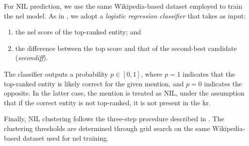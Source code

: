 For NIL prediction, we use the same Wikipedia-based dataset employed to train the \ac{nel} model.  
As in , we adopt a \textit{logistic regression classifier} that takes as input:
\begin{enumerate}
    \item the \ac{nel} score of the top-ranked entity; and
    \item the difference between the top score and that of the second-best candidate (\textit{secondiff}).
\end{enumerate}
The classifier outputs a probability $p \in [0,1]$, where $p = 1$ indicates that the top-ranked entity is likely correct for the given mention, and $p = 0$ indicates the opposite.  
In the latter case, the mention is treated as NIL, under the assumption that if the correct entity is not top-ranked, it is not present in the \ac{kr}.

Finally, NIL clustering follows the three-step procedure described in .  
The clustering thresholds are determined through grid search on the same Wikipedia-based dataset used for \ac{nel} training.









